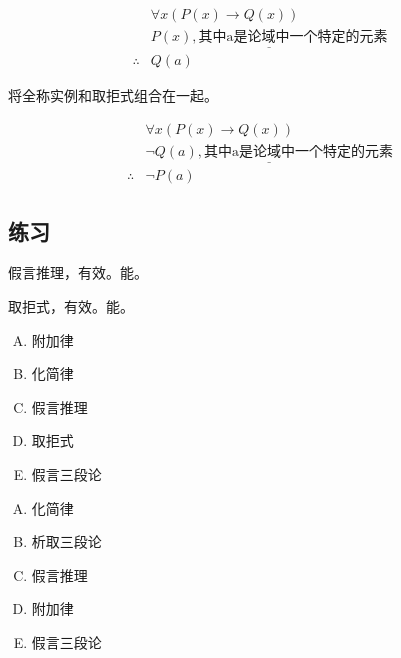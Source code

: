 {{        \begin{align*}
            &\forall x (P(x) \rightarrow Q(x)) \\
            &\underline{P(x), \text{其中a是论域中一个特定的元素}} \\
            \therefore &Q(a)
        \end{align*}

        将全称实例和取拒式组合在一起。

        \begin{align*}
            &\forall x (P(x) \rightarrow Q(x)) \\
            &\underline{\neg Q(a), \text{其中a是论域中一个特定的元素}} \\
            \therefore &\neg P(a)
        \end{align*}
    }

    \subsection{练习}
    {
        \begin{practices}
            假言推理，有效。能。
        \end{practices}

        \begin{practices}
            取拒式，有效。能。
        \end{practices}

        \begin{practices}
            \begin{enumerate}[A.]
                \item 附加律
                \item 化简律
                \item 假言推理
                \item 取拒式
                \item 假言三段论
            \end{enumerate}
        \end{practices}

        \begin{practices}
            \begin{enumerate}[A.]
                \item 化简律
                \item 析取三段论
                \item 假言推理
                \item 附加律
                \item 假言三段论
            \end{enumerate}
        \end{practices}

}}
